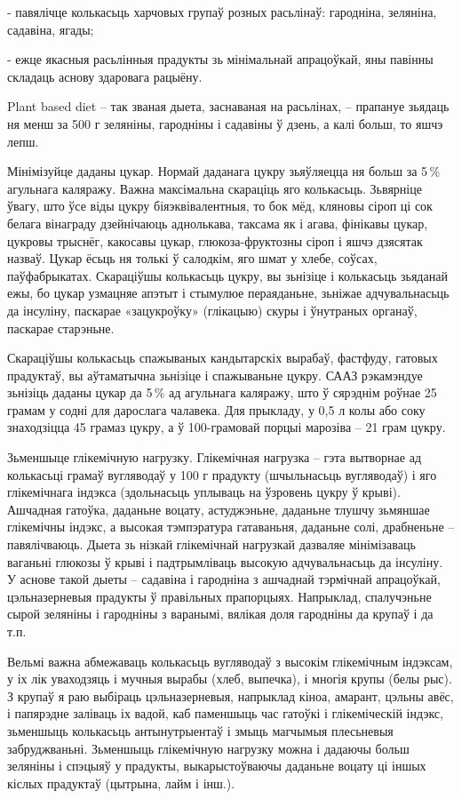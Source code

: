 - павялічце колькасьць харчовых групаў розных расьлінаў: гародніна, зеляніна, садавіна, ягады;

- ежце якасныя расьлінныя прадукты зь мінімальнай апрацоўкай, яны павінны складаць аснову здаровага рацыёну.

Plant based diet – так званая дыета, заснаваная на расьлінах, – прапануе зьядаць ня менш за 500 г зеляніны, гародніны і садавіны ў дзень, а калі больш, то яшчэ лепш.

Мінімізуйце даданы цукар. Нормай даданага цукру зьяўляецца ня больш за 5\,\% агульнага каляражу. Важна максімальна скараціць яго колькасьць. Зьвярніце ўвагу, што ўсе віды цукру біяэквівалентныя, то бок мёд, кляновы сіроп ці сок белага вінаграду дзейнічаюць аднолькава, таксама як і агава, фінікавы цукар, цукровы трыснёг, какосавы цукар, глюкоза-фруктозны сіроп і яшчэ дзясятак назваў. Цукар ёсьць ня толькі ў салодкім, яго шмат у хлебе, соўсах, паўфабрыкатах. Скараціўшы колькасьць цукру, вы зьнізіце і колькасьць зьяданай ежы, бо цукар узмацняе апэтыт і стымулюе пераяданьне, зьніжае адчувальнасьць да інсуліну, паскарае «зацукроўку» (глікацыю) скуры і ўнутраных органаў, паскарае старэньне.

Скараціўшы колькасьць спажываных кандытарскіх вырабаў, фастфуду, гатовых прадуктаў, вы аўтаматычна зьнізіце і спажываньне цукру. СААЗ рэкамэндуе зьнізіць даданы цукар да 5\,\% ад агульнага каляражу, што ў сярэднім роўнае 25 грамам у содні для дарослага чалавека. Для прыкладу, у 0,5 л колы або соку знаходзіцца 45 грамаз цукру, а ў 100-грамовай порцыі марозіва – 21 грам цукру.

Зьменшыце глікемічную нагрузку. Глікемічная нагрузка – гэта вытворнае ад колькасьці грамаў вугляводаў у 100 г прадукту (шчыльнасьць вугляводаў) і яго глікемічнага індэкса (здольнасьць уплываць на ўзровень цукру ў крыві). Ашчадная гатоўка, даданьне воцату, астуджэньне, даданьне тлушчу зьмяншае глікемічны індэкс, а высокая тэмпэратура гатаваньня, даданьне солі, драбненьне – павялічваюць. Дыета зь нізкай глікемічнай нагрузкай дазваляе мінімізаваць ваганьні глюкозы ў крыві і падтрымліваць высокую адчувальнасьць да інсуліну. У аснове такой дыеты – садавіна і гародніна з ашчаднай тэрмічнай апрацоўкай, цэльназерневыя прадукты ў правільных прапорцыях. Напрыклад, спалучэньне сырой зеляніны і гародніны з варанымі, вялікая доля гародніны да крупаў і да т.п.

Вельмі важна абмежаваць колькасьць вугляводаў з высокім глікемічным індэксам, у іх лік уваходзяць і мучныя вырабы (хлеб, выпечка), і многія крупы (белы рыс). З крупаў я раю выбіраць цэльназерневыя, напрыклад кіноа, амарант, цэльны авёс, і папярэдне заліваць іх вадой, каб паменшыць час гатоўкі і глікеміческій індэкс, зьменшыць колькасьць антынутрыентаў і змыць магчымыя плесьневыя забруджваньні. Зьменшыць глікемічную нагрузку можна і дадаючы больш зеляніны і спэцыяў у прадукты, выкарыстоўваючы даданьне воцату ці іншых кіслых прадуктаў (цытрына, лайм і інш.).

